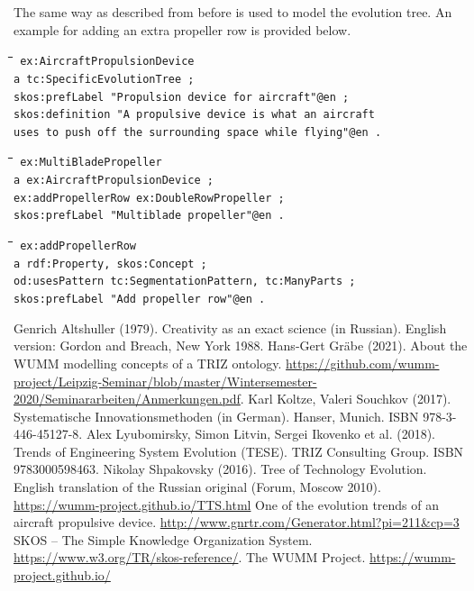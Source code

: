 \documentclass[11pt,a4paper]{article}
\newenvironment{code}{\tt \begin{tabbing}
\hskip12pt\=\hskip12pt\=\hskip12pt\=\hskip12pt\=\hskip5cm\=\hskip5cm\=\kill}
{\end{tabbing}}
\begin{document}
The same way as described from before is used to model the evolution tree. An
example for adding an extra propeller row is provided below. 

\begin{code}\tt
ex:AircraftPropulsionDevice \\
\> a tc:SpecificEvolutionTree ; \\
\> skos:prefLabel "Propulsion device for aircraft"@en ; \\
\> skos:definition "A propulsive device is what an aircraft \\
\>\> uses to push off the surrounding space while flying"@en .
\end{code}
\begin{code}\tt
ex:MultiBladePropeller \\
\> a ex:AircraftPropulsionDevice ; \\
\> ex:addPropellerRow ex:DoubleRowPropeller ; \\
\> skos:prefLabel "Multiblade propeller"@en .
\end{code}
\begin{code}\tt
ex:addPropellerRow \\
\> a rdf:Property, skos:Concept ; \\
\> od:usesPattern tc:SegmentationPattern, tc:ManyParts ; \\
\> skos:prefLabel "Add propeller row"@en .
\end{code}

\begin{thebibliography}{xxx}
\raggedright
{} Genrich Altshuller (1979).  Creativity as an exact
  science (in Russian). English version: Gordon and Breach, New York 1988.
 Hans-Gert Gr\"abe (2021). About the WUMM modelling
  concepts of a TRIZ ontology.  \url{https://github.com/wumm-project/Leipzig-Seminar/blob/master/Wintersemester-2020/Seminararbeiten/Anmerkungen.pdf}.
 Karl Koltze, Valeri Souchkov (2017).  Systematische
  Innovationsmethoden (in German).  Hanser, Munich. ISBN 978-3-446-45127-8.
 Alex Lyubomirsky, Simon Litvin, Sergei Ikovenko et al.
  (2018). Trends of Engineering System Evolution (TESE).  TRIZ Consulting
  Group. ISBN 9783000598463.
 Nikolay Shpakovsky (2016). Tree of Technology
  Evolution. English translation of the Russian original (Forum, Moscow
  2010).\\ \url{https://wumm-project.github.io/TTS.html}
 One of the evolution trends of an aircraft propulsive device. \url{http://www.gnrtr.com/Generator.html?pi=211&cp=3}
 SKOS -- The Simple Knowledge Organization System.
  \url{https://www.w3.org/TR/skos-reference/}.  
 The WUMM Project. \url{https://wumm-project.github.io/} 
\end{thebibliography}
\end{document}
